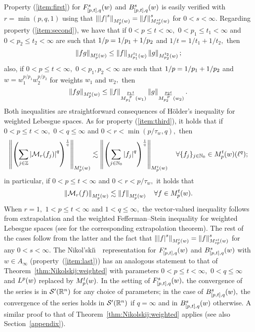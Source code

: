 Property (\ref{item:first}) for $\itlw{[p,t]}{s}{q}{w}$ and   $\ibesw{[p,t]}{s}{q}{w}$ is easily verified with  $r=\min(p,q,1)$ using that $\norm{\abs{f}^s}{\mow{p}{t}{w}}=\norm{f}{\mow{sp}{st}{w}}^s$ for $0<s<\infty.$ Regarding property (\ref{item:second}), we have that if $0<p\le t<\infty,$ $0<p_1\le t_1<\infty$ and $0<p_2\le t_2<\infty$ are such that $\hcline$ and $1/t=1/t_1+1/t_2,$ then  
\begin{equation*}
\norm{fg}{\mow{p}{t}{w}}\le \norm{f}{\mow{p_1}{t_1}{w}} \norm{g}{\mow{p_2}{t_2}{w}};
\end{equation*}
also, if $0<p\le t<\infty,$ $0<p_1,p_2<\infty$ are such that $\hcline$ and $w=w_1^{p/p_1}w_2^{p/p_2}$ for weights $w_1$ and $w_2,$ then 
\begin{equation*}
\norm{fg}{\mow{p}{t}{w}}\le \norm{f}{\mow{p_1}{\frac{p_1t}{p}}{w_1}} \norm{g}{\mow{p_2}{\frac{p_2t}{p}}{w_2}}.
\end{equation*}
Both inequalities are  straightforward consequences of H\"older's inequality for weighted Lebesgue spaces. As for property (\ref{item:third}), it holds that  if $0<p\le t<\infty,$  $0<q\le \infty$ and  $0<r<\min(p/\tau_w,q),$ then
\begin{equation}\label{eq:FTMorrey}
\norm{\left(\sum_{j\in\ent} \abs{\M_r(f_j)}^q\right)^{\frac{1}{q}}}{\mow{p}{t}{w}}\lesssim \norm{\left(\sum_{j\in\na_0} \abs{f_j}^q\right)^{\frac{1}{q}}}{\mow{p}{t}{w}}\quad \forall \{f_j\}_{j\in \na_0}\in \mow{p}{t}{w}(\ell^q);  
\end{equation}
in particular, if $0<p\le t<\infty$ and $0<r<p/\tau_w,$ it holds that 
\begin{equation*}
\norm{\M_r(f)}{\mow{p}{t}{w}}\lesssim \norm{f}{\mow{p}{t}{w}}\quad \forall f\in \mow{p}{t}{w}. 
\end{equation*}
When $r=1,$ $1<p\le t<\infty$   and $1<q\le \infty,$  the vector-valued inequality follows from extrapolation and the weighted Fefferman--Stein inequality for weighted Lebesgue spaces (see \cite[Theorem 5.3]{MR3538648} for the corresponding extrapolation theorem). The rest of the cases follow from the latter and the fact that $\norm{\abs{f}^s}{\mow{p}{t}{w}}=\norm{f}{\mow{sp}{st}{w}}^s$ for any $0<s<\infty.$  The Nikol'ski\u\i$\text{ }$ representation for $\itlw{[p,t]}{s}{q}{w}$ and $\ibesw{[p,t]}{s}{q}{w}$ with $w\in A_\infty$  (property~(\ref{item:last}))  has an analogous statement to that of Theorem~\ref{thm:Nikolskij:weighted} with parameters $0<p\le t<\infty,$ $0<q\le \infty$  and $\lebw{p}{w}$ replaced by $\mow{p}{t}{w}.$ In the setting of $\itlw{[p,t]}{s}{q}{w},$ the convergence of the series is in $\swp$ for any choice of parameters; in the case of $\ibesw{[p,t]}{s}{q}{w},$ the convergence of the series holds in $\swp$ if $q=\infty$ and in $\ibesw{[p,t]}{s}{q}{w}$ otherwise. A similar proof to that of Theorem~\ref{thm:Nikolskij:weighted} applies (see  also Section~\ref{appendix}).

